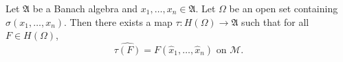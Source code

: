
Let $\mathfrak{A}$ be a Banach algebra and $x_1, \ldots, x_n \in \mathfrak{A}$. Let $\Omega$ be an open set containing $\sigma(x_1, \ldots, x_n)$. Then there exists a map $\tau: H(\Omega) \to \mathfrak{A}$ such that for all $F \in H(\Omega)$,
$$\widehat{\tau(F)} = F(\hat{x}_1, \ldots, \hat{x}_n) \text{ on } \mathcal{M}.$$

